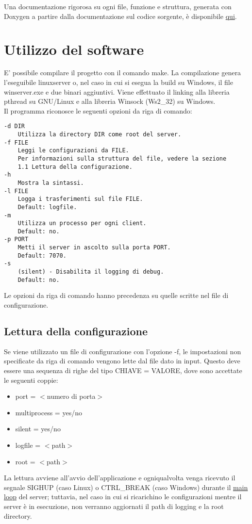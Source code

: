 \documentclass{article}
\begin{document}
\tableofcontents

\vspace{15mm} %
Una documentazione rigorosa su ogni file, funzione e struttura, generata con Doxygen a partire dalla 
documentazione sul codice sorgente, è disponibile \href{html/index.html}{qui}. 

\newpage

\section{Utilizzo del software}

E' possibile compilare il progetto con il comando make. La compilazione genera l'eseguibile linuxserver o,
nel caso in cui si esegua la build su Windows, il file winserver.exe e due binari aggiuntivi.
Viene effettuato il linking alla libreria pthread su GNU/Linux e alla libreria Winsock (Ws2\_32) su Windows.\\
Il programma riconosce le seguenti opzioni da riga di comando:\\
\begin{lstlisting}
-d DIR
    Utilizza la directory DIR come root del server.
-f FILE 
    Leggi le configurazioni da FILE. 
    Per informazioni sulla struttura del file, vedere la sezione 
    1.1 Lettura della configurazione.
-h
    Mostra la sintassi.
-l FILE
    Logga i trasferimenti sul file FILE. 
    Default: logfile.
-m 
    Utilizza un processo per ogni client. 
    Default: no.
-p PORT
    Metti il server in ascolto sulla porta PORT. 
    Default: 7070.
-s
    (silent) - Disabilita il logging di debug. 
    Default: no.

\end{lstlisting}
Le opzioni da riga di comando hanno precedenza su quelle scritte nel file di configurazione.

\subsection{Lettura della configurazione}

Se viene utilizzato un file di configurazione con l'opzione -f, le impostazioni non specificate
da riga di comando vengono lette dal file dato in input. Questo deve essere una sequenza di righe del tipo CHIAVE = VALORE, 
dove sono accettate le seguenti coppie:
\begin{itemize}
    \item port = $<$numero di porta$>$
    \item multiprocess = yes/no
    \item silent = yes/no
    \item logfile = $<$path$>$
    \item root = $<$path$>$
\end{itemize}
La lettura avviene all'avvio dell'applicazione e ogniqualvolta venga ricevuto il segnale 
SIGHUP (caso Linux) o CTRL\_BREAK (caso Windows) durante il \href{html/server_8h.html#a533c9a4292e9d1106ff7c54fbf75090a}
{main loop} del server; tuttavia, nel caso in cui si ricarichino le configurazioni mentre il server è in esecuzione,
non verranno aggiornati il path di logging e la root directory.\\
\end{document}
